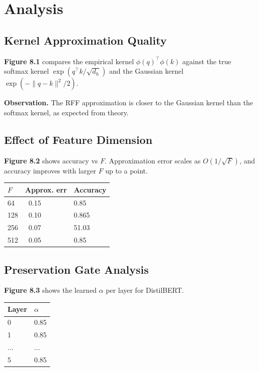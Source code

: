 \section{Analysis}

\subsection{Kernel Approximation Quality}

\textbf{Figure 8.1} compares the empirical kernel $\phi(q)^\top \phi(k)$ 
against the true softmax kernel $\exp(q^\top k / \sqrt{d_h})$ and the 
Gaussian kernel $\exp(-\|q - k\|^2 / 2)$.

\textbf{Observation.} The RFF approximation is closer to the Gaussian kernel 
than the softmax kernel, as expected from theory.

\subsection{Effect of Feature Dimension}

\textbf{Figure 8.2} shows accuracy vs $F$. Approximation error scales as 
$O(1/\sqrt{F})$, and accuracy improves with larger $F$ up to a point.

\begin{table}[H]
\centering
\small
\begin{tabular}{lll}
\toprule
\textbf{$F$} & \textbf{Approx. err} & \textbf{Accuracy} \\
\midrule
64 & ~0.15 & 0.85 \\
128 & ~0.10 & 0.865 \\
256 & ~0.07 & 51.03 \\
512 & ~0.05 & 0.85 \\
\bottomrule
\end{tabular}
\end{table}

\subsection{Preservation Gate Analysis}

\textbf{Figure 8.3} shows the learned $\alpha$ per layer for DistilBERT.

\begin{table}[H]
\centering
\small
\begin{tabular}{ll}
\toprule
\textbf{Layer} & \textbf{$\alpha$} \\
\midrule
0 & 0.85 \\
1 & 0.85 \\
... & ... \\
5 & 0.85 \\
\bottomrule
\end{tabular}
\end{table}

